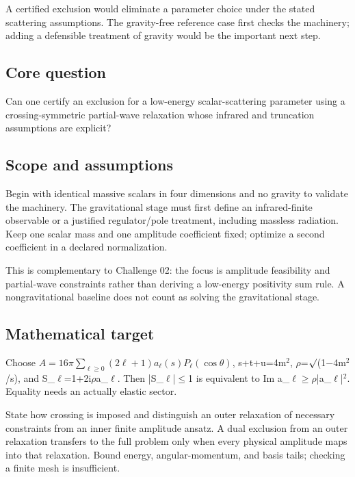 \documentclass[
  11pt,
]{article}
\begin{document}
A certified exclusion would eliminate a parameter choice under the
stated scattering assumptions. The gravity-free reference case first
checks the machinery; adding a defensible treatment of gravity would be
the important next step.

\subsection{Core question}

Can one certify an exclusion for a low-energy scalar-scattering
parameter using a crossing-symmetric partial-wave relaxation whose
infrared and truncation assumptions are explicit?

\subsection{Scope and assumptions}

Begin with identical massive scalars in four dimensions and no gravity
to validate the machinery. The gravitational stage must first define an
infrared-finite observable or a justified regulator/pole treatment,
including massless radiation. Keep one scalar mass and one amplitude
coefficient fixed; optimize a second coefficient in a declared
normalization.

This is complementary to Challenge 02: the focus is amplitude
feasibility and partial-wave constraints rather than deriving a
low-energy positivity sum rule. A nongravitational baseline does not
count as solving the gravitational stage.

\subsection{Mathematical target}

Choose \(A=16\pi\sum_{\ell\ge0}(2\ell+1)a_\ell(s)P_\ell(\cos\theta)\),
s+t+u=4m\ensuremath{{}^{2}},
\ensuremath{\rho}=\ensuremath{\surd}(1\ensuremath{-}4m\ensuremath{{}^{2}}/s),
and S\_\ensuremath{\ell}=1+2i\ensuremath{\rho}a\_\ensuremath{\ell}. Then
|S\_\ensuremath{\ell}|\ensuremath{\le}1 is equivalent to Im
a\_\ensuremath{\ell}\ensuremath{\ge}\ensuremath{\rho}|a\_\ensuremath{\ell}|\ensuremath{{}^{2}}.
Equality needs an actually elastic sector.

State how crossing is imposed and distinguish an outer relaxation of
necessary constraints from an inner finite amplitude ansatz. A dual
exclusion from an outer relaxation transfers to the full problem only
when every physical amplitude maps into that relaxation. Bound energy,
angular-momentum, and basis tails; checking a finite mesh is
insufficient.
\end{document}
